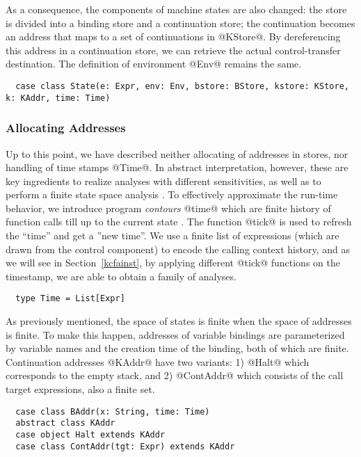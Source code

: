 \documentclass[acmsmall, screen]{acmart}\settopmatter{}
\begin{document}
As a consequence, the components of machine states are also changed: the store is divided
into a binding store and a continuation store; the continuation becomes an address
that maps to a set of continuations in @KStore@.
By dereferencing this address in a continuation store, we can retrieve the actual
control-transfer destination. The definition of environment @Env@ remains the same.

\begin{lstlisting}
  case class State(e: Expr, env: Env, bstore: BStore, kstore: KStore, k: KAddr, time: Time)
\end{lstlisting}

\subsubsection{Allocating Addresses}
Up to this point, we have described neither allocating of addresses in stores, nor handling
of time stamps @Time@. In abstract interpretation, however, these are key ingredients
to realize analyses with different sensitivities, as well as to perform a finite
state space analysis \cite{Gilray:2016:ACP:2951913.2951936}.
To effectively approximate the run-time behavior, we introduce program \emph{contours} @time@
which are finite history of function calls till up to the current state \cite{Shivers:1991:SSC:115865.115884}.
The function @tick@ is used to refresh the ``time'' and get a ''new time''.
We use a finite list of expressions (which are drawn from the control component) to encode the
calling context history, and as we will see in Section~\ref{kcfainst}, by applying different
@tick@ functions on the timestamp, we are able to obtain a family of analyses.

\begin{lstlisting}
  type Time = List[Expr]
\end{lstlisting}

As previously mentioned, the space of states is finite when the space of addresses is finite.
To make this happen, addresses of variable bindings are parameterized by variable names and the creation
time of the binding, both of which are finite. Continuation addresses @KAddr@ have two variants:
1) @Halt@ which corresponds to the empty stack, and
2) @ContAddr@ which consists of the call target expressions, also a finite set.

\begin{lstlisting}
  case class BAddr(x: String, time: Time)
  abstract class KAddr
  case object Halt extends KAddr
  case class ContAddr(tgt: Expr) extends KAddr
\end{lstlisting}
\end{document}
